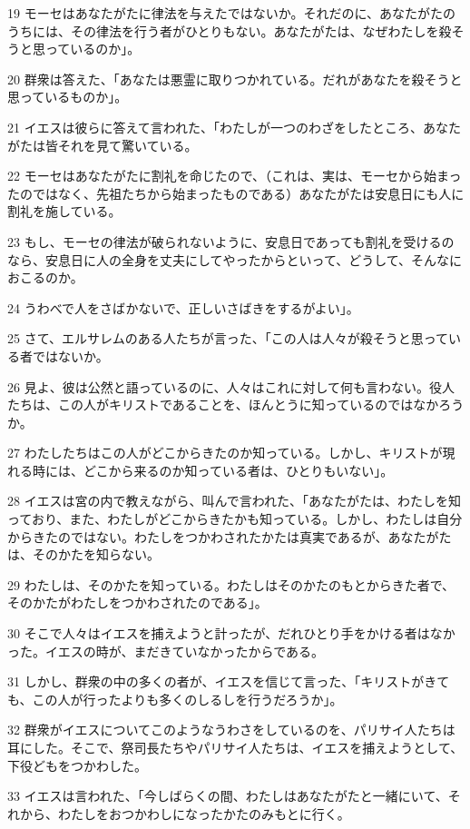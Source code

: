 \par 19 モーセはあなたがたに律法を与えたではないか。それだのに、あなたがたのうちには、その律法を行う者がひとりもない。あなたがたは、なぜわたしを殺そうと思っているのか」。
\par 20 群衆は答えた、「あなたは悪霊に取りつかれている。だれがあなたを殺そうと思っているものか」。
\par 21 イエスは彼らに答えて言われた、「わたしが一つのわざをしたところ、あなたがたは皆それを見て驚いている。
\par 22 モーセはあなたがたに割礼を命じたので、（これは、実は、モーセから始まったのではなく、先祖たちから始まったものである）あなたがたは安息日にも人に割礼を施している。
\par 23 もし、モーセの律法が破られないように、安息日であっても割礼を受けるのなら、安息日に人の全身を丈夫にしてやったからといって、どうして、そんなにおこるのか。
\par 24 うわべで人をさばかないで、正しいさばきをするがよい」。
\par 25 さて、エルサレムのある人たちが言った、「この人は人々が殺そうと思っている者ではないか。
\par 26 見よ、彼は公然と語っているのに、人々はこれに対して何も言わない。役人たちは、この人がキリストであることを、ほんとうに知っているのではなかろうか。
\par 27 わたしたちはこの人がどこからきたのか知っている。しかし、キリストが現れる時には、どこから来るのか知っている者は、ひとりもいない」。
\par 28 イエスは宮の内で教えながら、叫んで言われた、「あなたがたは、わたしを知っており、また、わたしがどこからきたかも知っている。しかし、わたしは自分からきたのではない。わたしをつかわされたかたは真実であるが、あなたがたは、そのかたを知らない。
\par 29 わたしは、そのかたを知っている。わたしはそのかたのもとからきた者で、そのかたがわたしをつかわされたのである」。
\par 30 そこで人々はイエスを捕えようと計ったが、だれひとり手をかける者はなかった。イエスの時が、まだきていなかったからである。
\par 31 しかし、群衆の中の多くの者が、イエスを信じて言った、「キリストがきても、この人が行ったよりも多くのしるしを行うだろうか」。
\par 32 群衆がイエスについてこのようなうわさをしているのを、パリサイ人たちは耳にした。そこで、祭司長たちやパリサイ人たちは、イエスを捕えようとして、下役どもをつかわした。
\par 33 イエスは言われた、「今しばらくの間、わたしはあなたがたと一緒にいて、それから、わたしをおつかわしになったかたのみもとに行く。
